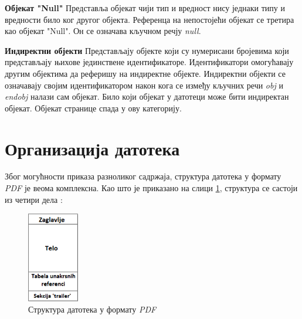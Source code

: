 \documentclass[12pt,oneside]{memoir}
\begin{document}
\begin{description}
\item \textbf{Објекат "Null"} Представља објекат чији тип и вредност нису једнаки типу и вредности било ког другог објекта. Референца на непостојећи објекат се третира као објекат "Null". Он се означава кључном речју \textit{null}.
\item \textbf{Индиректни објекти} Представљају објекте који су нумерисани бројевима који представљају њихове јединствене идентификаторе. Идентификатори омогућавају другим објектима да реферишу на индиректне објекте. Индиректни објекти се означавају својим идентификатором након кога се између кључних речи \textit{obj} и \textit{endobj} налази сам објекат. Било који објекат у датотеци може бити индиректан објекат. Објекат странице спада у ову категорију.
\end{description} 

\section{Организација датотека}
\label{sec:organizacijaDatotekaPDF}

Због могућности приказа разноликог садржаја, структура датотека у формату \textit{PDF} је веома комплексна. Као што је приказано на слици \ref{fig:pdfStruktura1}, структура се састоји из четири дела \cite{PDFDoc, introToPdf, basicStrPdf}:

\begin{figure}[!ht]
\centering
\includegraphics[width=0.2\textwidth]{pdfStruktura1_ispravljeno.png}
\caption{Структура датотека у формату \textit{PDF}}
\label{fig:pdfStruktura1}
\end{figure}
\end{document}
